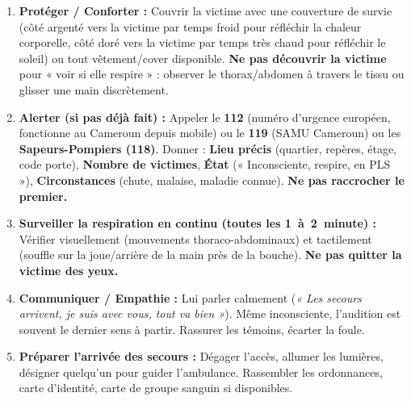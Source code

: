 \documentclass[11pt]{article}
\begin{document}
\begin{propriete}
\begin{enumerate}
    \item \textbf{Protéger / Conforter :} Couvrir la victime avec une couverture de survie (côté argenté vers la victime par temps froid pour réfléchir la chaleur corporelle, côté doré vers la victime par temps très chaud pour réfléchir le soleil) ou tout vêtement/cover disponible. \textbf{Ne pas découvrir la victime} pour « voir si elle respire » : observer le thorax/abdomen à travers le tissu ou glisser une main discrètement.
    \item \textbf{Alerter (si pas déjà fait) :} Appeler le \textbf{112} (numéro d'urgence européen, fonctionne au Cameroun depuis mobile) ou le \textbf{119} (SAMU Cameroun) ou les \textbf{Sapeurs-Pompiers (\SI{118}{})}. Donner : \textbf{Lieu précis} (quartier, repères, étage, code porte), \textbf{Nombre de victimes}, \textbf{État} (« Inconsciente, respire, en PLS »), \textbf{Circonstances} (chute, malaise, maladie connue). \textbf{Ne pas raccrocher le premier.}
    \item \textbf{Surveiller la respiration \textbf{en continu} (toutes les \SI{1}{ à \SI{2}{minute}}) :} Vérifier visuellement (mouvements thoraco-abdominaux) et tactilement (souffle sur la joue/arrière de la main près de la bouche). \textbf{Ne pas quitter la victime des yeux.}
    \item \textbf{Communiquer / Empathie :} Lui parler calmement (\emph{« Les secours arrivent, je suis avec vous, tout va bien »}). Même inconsciente, l'audition est souvent le dernier sens à partir. Rassurer les témoins, écarter la foule.
    \item \textbf{Préparer l'arrivée des secours :} Dégager l'accès, allumer les lumières, désigner quelqu'un pour guider l'ambulance. Rassembler les ordonnances, carte d'identité, carte de groupe sanguin si disponibles.
\end{enumerate}
\end{propriete}
\end{document}
